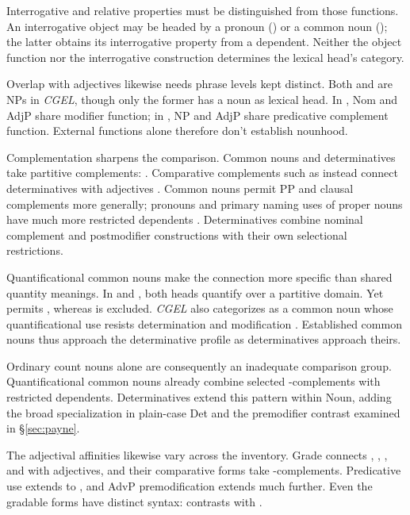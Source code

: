 \documentclass[12pt]{article}
\begin{document}
Interrogative and relative properties must be distinguished from those functions. An interrogative object may be headed by a pronoun () or a common noun (); the latter obtains its interrogative property from a dependent. Neither the object function nor the interrogative construction determines the lexical head's category.

Overlap with adjectives likewise needs phrase levels kept distinct. Both  and  are NPs in \textit{CGEL}, though only the former has a noun as lexical head. In , Nom and AdjP share modifier function; in , NP and AdjP share predicative complement function. External functions alone therefore don't establish nounhood.

Complementation sharpens the comparison. Common nouns and determinatives take partitive complements: . Comparative complements such as  instead connect determinatives with adjectives \citep[349--350, 392--394, 411--412, 432--433]{huddleston2002}. Common nouns permit PP and clausal complements more generally; pronouns and primary naming uses of proper nouns have much more restricted dependents \citep[429--430, 439--443, 517--521]{huddleston2002}. Determinatives combine nominal complement and postmodifier constructions with their own selectional restrictions.

Quantificational common nouns make the connection more specific than shared quantity meanings. In  and , both heads quantify over a partitive domain. Yet  permits , whereas  is excluded. \textit{CGEL} also categorizes  as a common noun whose quantificational use resists determination and modification \citep[349--350]{huddleston2002}. Established common nouns thus approach the determinative profile as determinatives approach theirs.

Ordinary count nouns alone are consequently an inadequate comparison group. Quantificational common nouns already combine selected -complements with restricted dependents. Determinatives extend this pattern within Noun, adding the broad specialization in plain-case Det and the premodifier contrast examined in §\ref{sec:payne}.

The adjectival affinities likewise vary across the inventory. Grade connects , , , and  with adjectives, and their comparative forms take -complements. Predicative use extends to , and AdvP premodification extends much further. Even the gradable forms have distinct syntax:  contrasts with  \citep[392--396, 539--540]{huddleston2002}.
\end{document}
